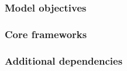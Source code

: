\documentclass{article}
\begin{document}
\subsubsection{Model objectives}

\subsubsection{Core frameworks}

\subsubsection{Additional dependencies}

\end{document}

